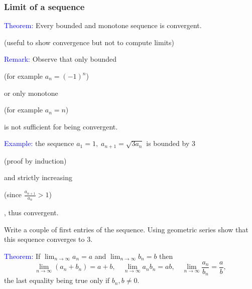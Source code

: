 \documentclass[11pt,aspectratio=169]{beamer}
\begin{document}
\begin{frame}
\frametitle{Limit of a sequence}
\textcolor{blue}{Theorem:} Every bounded and monotone sequence is convergent. \\\begin{tiny} (useful to show convergence but not to compute limits) \end{tiny}
\vskip 12pt
\textcolor{blue}{Remark:} Observe that only bounded  \begin{tiny}(for example $a_n=(-1)^n$)\end{tiny} or only monotone  \begin{tiny}(for example $a_n=n$)\end{tiny} is not sufficient for being convergent.

\vskip 12pt

\textcolor{blue}{Example:} the sequence $a_1=1, \; a_{n+1}=\sqrt{3a_n}$ is bounded by $3$ \begin{tiny} (proof by induction) \end{tiny} and strictly increasing \begin{tiny} (since $\frac{a_{n+1}}{a_n}>1$)\end{tiny}, thus convergent.

\begin{tiny}Write a couple of first entries of the sequence. Using geometric series show that this sequence converges to $3$.  \end{tiny}
\vskip 12pt

\textcolor{blue}{Theorem:} If $\lim_{n \rightarrow \infty} a_n=a$ and $\lim_{n \rightarrow \infty} b_n=b$
then $$\lim_{n \rightarrow \infty} (a_n+b_n)=a+b, \quad\lim_{n \rightarrow \infty} a_nb_n=ab,
\quad\lim_{n \rightarrow \infty} \frac{a_n}{b_n}=\frac{a}{b},$$
the last equality being true only if $b_n,b\neq0$.
 


\end{frame}
\end{document}
